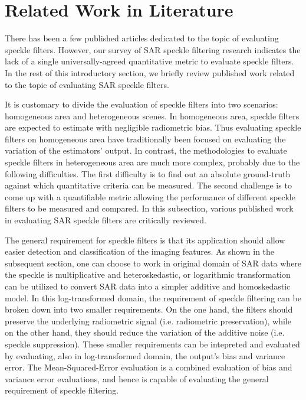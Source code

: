 \documentclass[journal]{IEEEtran}
\begin{document}
\section{Related Work in Literature}
\label{sec:lit_review}

There has been a few published articles dedicated to the topic of evaluating speckle filters.
However, our survey of SAR speckle filtering research indicates 
	the lack of a single universally-agreed quantitative metric to evaluate speckle filters.
In the rest of this introductory section, we briefly review published work 
	related to the topic of evaluating SAR speckle filters.	

It is customary to divide the evaluation of speckle filters into two scenarios:
	homogeneous area and heterogeneous scenes.
In homogeneous area,
	speckle filters are expected to estimate with negligible radiometric bias.
Thus evaluating speckle filters on homogeneous area have traditionally been focused on evaluating the variation of the estimators' output.
In contrast, the methodologies to evaluate speckle filters in heterogeneous area are much more complex, probably due to the following difficulties.
The first difficulty is to find out an absolute ground-truth against which quantitative criteria can be measured.
The second challenge is to come up with a quantifiable metric allowing the performance of different speckle filters to be measured and compared.
In this subsection, various published work in evaluating SAR speckle filters are critically reviewed.

The general requirement for speckle filters is that its application should allow easier detection and classification of the imaging features.
As shown in the subsequent section, 
	one can choose to work in original domain of SAR data where the speckle is multiplicative and heteroskedastic, or
	logarithmic transformation can be utilized to convert SAR data into a simpler additive and homoskedastic model.
In this log-transformed domain, the requirement of speckle filtering can be broken down into two smaller requirements.
On the one hand, the filters should preserve the underlying radiometric signal (i.e. radiometric preservation), while on the other hand, they should reduce the variation of the additive noise (i.e. speckle suppression).
These smaller requirements can be intepreted and evaluated by evaluating, also in log-transformed domain, the output's bias and variance error.
The Mean-Squared-Error evaluation is a combined evaluation of bias and variance error evaluations, and hence is capable of evaluating the general requirement of speckle filtering.
\end{document}
